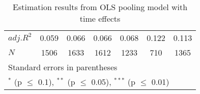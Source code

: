 \begin{table}[p]
\begin{tabular}{l*{6}{c}}
$adj.R^2$ 		&0.059 		&0.066 		&0.066 		&0.068 		&0.122 		&0.113 \\
$N$ 		&\multicolumn{1}{c}{1506} 		&\multicolumn{1}{c}{1633} 		&\multicolumn{1}{c}{1612} 		&\multicolumn{1}{c}{1233} 		&\multicolumn{1}{c}{710} 		&\multicolumn{1}{c}{1365} \\
\hline\hline
\multicolumn{7}{l}{\footnotesize Standard errors in parentheses}\\
\multicolumn{7}{l}{\footnotesize $^{*}$ (p $\le$ 0.1), $^{**}$ (p $\le$ 0.05), $^{***}$ (p $\le$ 0.01)}\\
\end{tabular}
\caption{Estimation results from OLS pooling model with time effects}
\label{tab:fe6}
\end{table}
